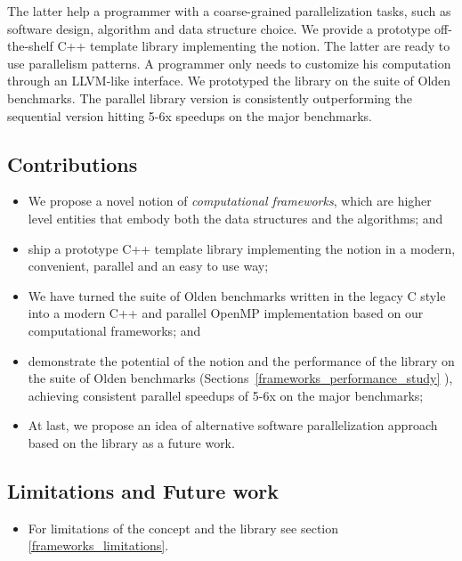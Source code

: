 The latter help a programmer with a coarse-grained parallelization tasks, such as software design, algorithm and data structure choice. We provide a prototype off-the-shelf C++ template library implementing the notion. The latter are ready to use parallelism patterns. A programmer only needs to customize his computation through an LLVM-like interface. We prototyped the library on the suite of Olden benchmarks. The parallel library version is consistently outperforming the sequential version hitting 5-6x speedups on the major benchmarks.


\subsection{Contributions}
\begin{itemize}[style=unboxed,leftmargin=0cm]
\itemsep0em
\renewcommand\labelitemi{$\vartriangleright$}
\renewcommand\labelitemii{$\bullet$}
\item We propose a novel notion of \textit{computational frameworks}, which are higher level entities that embody both the data structures and the algorithms; and
\item ship a prototype C++ template library implementing the notion in a modern, convenient, parallel and an easy to use way;
\item We have turned the suite of Olden benchmarks written in the legacy C style into a modern C++ and parallel OpenMP implementation based on our computational frameworks; and
\item demonstrate the potential of the notion and the performance of the library on the suite of Olden benchmarks (Sections~\ref{frameworks_performance_study} ), achieving consistent parallel speedups of 5-6x on the major benchmarks;
\item At last, we propose an idea of alternative software parallelization approach based on the library as a future work.
\end{itemize}

\subsection{Limitations and Future work}
\begin{itemize}[style=unboxed,leftmargin=0cm]
\itemsep0em
\renewcommand\labelitemi{$\vartriangleright$}
\renewcommand\labelitemii{$\bullet$}
\item For limitations of the concept and the library see section \ref{frameworks_limitations}.
\end{itemize}


%